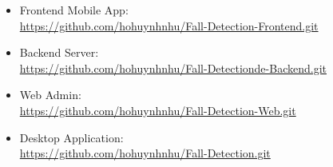 \documentclass[12pt]{report}
\begin{document}
\begin{itemize}
    \item Frontend Mobile App: \\
    \url{https://github.com/hohuynhnhu/Fall-Detection-Frontend.git}

    \item Backend Server: \\
    \url{https://github.com/hohuynhnhu/Fall-Detectionde-Backend.git}

    \item Web Admin: \\
    \url{https://github.com/hohuynhnhu/Fall-Detection-Web.git}

    \item Desktop Application: \\
    \url{https://github.com/hohuynhnhu/Fall-Detection.git}
\end{itemize}



\clearpage
\end{document}
